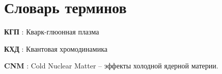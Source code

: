 \chapter*{Словарь терминов}             %

\textbf{КГП} : Кварк-глюонная плазма 

\textbf{КХД} : Квантовая хромодинамика

\textbf{CNM} : Cold Nuclear Matter -- эффекты холодной ядерной материи.



